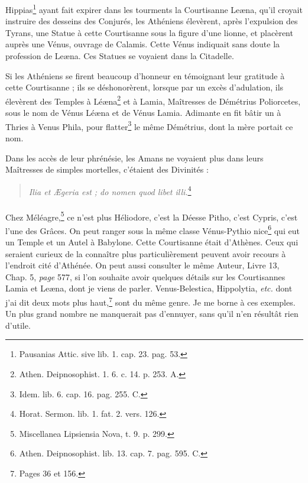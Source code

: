 \documentclass[a4paper, 11pt, oneside, polutonikogreek, french]{article}
\begin{document}
Hippias\footnote{Pausanias Attic. sive lib. 1. cap. 23. pag. 53.} ayant fait expirer dans les tourments la Courtisanne Leæna, qu'il croyait instruire des desseins des Conjurés, les Athéniens élevèrent, après l'expulsion des Tyrans, une Statue à cette Courtisanne sous la figure d'une lionne, et placèrent auprès une Vénus, ouvrage de Calamis. Cette Vénus indiquait sans doute la profession de Leæna. Ces Statues se voyaient dans la Citadelle.

Si les Athéniens se firent beaucoup d'honneur en témoignant leur gratitude à cette Courtisanne ; ils se déshonorèrent, lorsque par un excès d'adulation, ils élevèrent des Temples à Léæna\footnote{Athen. Deipnosophist. 1. 6. c. 14. p. 253. A.} et à Lamia, Maîtresses de Démétrius Poliorcetes, sous le nom de Vénus Léæna et de Vénus Lamia. Adimante en fit bâtir un à Thries à Venus Phila, pour flatter\footnote{Idem. lib. 6. cap. 16. pag. 255. C.} le même Démétrius, dont la mère portait ce nom.

Dans les accès de leur phrénésie, les Amans ne voyaient plus dans leurs Maîtresses de simples mortelles, c'étaient des Divinités :
\begin{quotation}
\emph{Ilia et Ægeria est ; do nomen quod libet illi.}\footnote{Horat. Sermon. lib. 1. fat. 2. vers. 126.}
\end{quotation}
\paragraph{}
Chez Méléagre,\footnote{Miscellanea Lipsiensia Nova, t. 9. p. 299.} ce n'est plus Héliodore, c'est la Déesse Pitho, c'est Cypris, c'est l'une des Grâces. On peut ranger sous la même classe Vénus-Pythio nice\footnote{Athen. Deipnosophist. lib. 13. cap. 7. pag. 595. C.} qui eut un Temple et un Autel à Babylone. Cette Courtisanne était d'Athènes. Ceux qui seraient curieux de la connaître plus particulièrement peuvent avoir recours à l'endroit cité d'Athénée. On peut aussi consulter le même Auteur, Livre 13, Chap. 5, \emph{page} 577, si l'on souhaite avoir quelques détails sur les Courtisannes Lamia et Leæna, dont je viens de parler. Venus-Belestica, Hippolytia, \emph{etc.} dont j'ai dit deux mots plus haut,\footnote{Pages 36 et 156.} sont du même genre. Je me borne à ces exemples. Un plus grand nombre ne manquerait pas d'ennuyer, sans qu'il n'en résultât rien d'utile.
\end{document}
